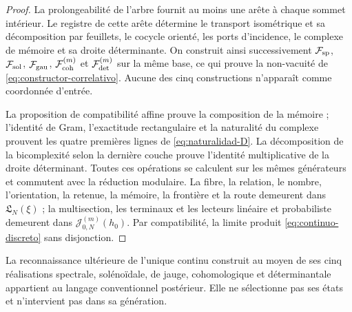 \begin{proof}
La prolongeabilité de l'arbre fournit au moins une arête à chaque sommet intérieur. Le registre de cette arête détermine le transport isométrique et sa décomposition par feuillets, le cocycle orienté, les ports d'incidence, le complexe de mémoire et sa droite déterminante. On construit ainsi successivement \(\mathcal F_{\rm sp}\), \(\mathcal F_{\rm sol}\), \(\mathcal F_{\rm gau}\), \(\mathcal F_{\rm coh}^{(m)}\) et \(\mathcal F_{\rm det}^{(m)}\) sur la même base, ce qui prouve la non-vacuité de \eqref{eq:constructor-correlativo}. Aucune des cinq constructions n'apparaît comme coordonnée d'entrée.

La proposition de compatibilité affine prouve la composition de la mémoire ;
l'identité de Gram, l'exactitude rectangulaire et la naturalité du complexe
prouvent les quatre premières lignes de \eqref{eq:naturalidad-D}. La
décomposition de la bicomplexité selon la dernière couche prouve l'identité
multiplicative de la droite déterminant. Toutes ces opérations se calculent
sur les mêmes générateurs et commutent avec la réduction modulaire. La fibre,
la relation, le nombre, l'orientation, la retenue, la mémoire, la frontière et
la route demeurent dans \(\mathfrak L_N(\xi)\) ; la multisection, les terminaux
et les lecteurs linéaire et probabiliste demeurent dans
\(\mathcal J_{0,N}^{(m)}(h_0)\). Par compatibilité, la limite produit
\eqref{eq:continuo-discreto} sans disjonction.
\end{proof}

La reconnaissance ultérieure de l'unique continu construit au moyen de ses cinq
réalisations spectrale, solénoïdale, de jauge, cohomologique et déterminantale
appartient au langage conventionnel postérieur. Elle ne sélectionne pas ses états et
n'intervient pas dans sa génération.
\fi


